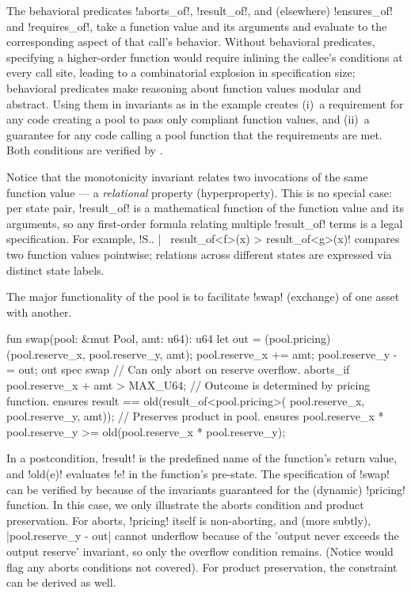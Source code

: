The behavioral predicates !aborts_of!, !result_of!, and (elsewhere) !ensures_of! and !requires_of!, take a function value and its arguments and evaluate to the corresponding aspect of that call's behavior.
Without behavioral predicates, specifying a higher-order function would require inlining the callee's conditions at every call site, leading to a combinatorial explosion in specification size; behavioral predicates make reasoning about function values modular and abstract.
Using them in invariants as in the example creates (i)~a requirement for any code creating a pool to pass only compliant function values, and (ii)~a guarantee for any code calling a pool function that the requirements are met. Both conditions are verified by \MVP.

Notice that the monotonicity invariant relates two invocations of the same function value --- a \emph{relational} property (hyperproperty).
This is no special case: per state pair, !result_of! is a mathematical function of the function value and its arguments, so any first-order formula relating multiple !result_of! terms is a legal specification.
For example, !S.. |~ result_of<f>(x) > result_of<g>(x)! compares two function values pointwise; relations across different states are expressed via distinct state labels.

The major functionality of the pool is to facilitate !swap! (exchange) of one asset with another.

\begin{MoveBox}
  fun swap(pool: &mut Pool, amt: u64): u64 {
    let out = (pool.pricing)
              (pool.reserve_x, pool.reserve_y, amt);
    pool.reserve_x += amt; pool.reserve_y -= out;
    out
  }
  spec swap {
    // Can only abort on reserve overflow.
    aborts_if pool.reserve_x + amt > MAX_U64;
    // Outcome is determined by pricing function.
    ensures result == old(result_of<pool.pricing>(
              pool.reserve_x, pool.reserve_y, amt));
    // Preserves product in pool.
    ensures pool.reserve_x * pool.reserve_y
         >= old(pool.reserve_x * pool.reserve_y);
  }
\end{MoveBox}

\noindent In a postcondition, !result! is the predefined name of the function's return value, and !old(e)! evaluates !e! in the function's pre-state.
The specification of !swap! can be verified by \MVP because of the invariants guaranteed for the (dynamic) !pricing! function. In this case, we only illustrate the aborts condition and product preservation. For aborts, !pricing! itself is non-aborting, and (more subtly), |pool.reserve_y - out| cannot underflow because of the 'output never exceeds the output reserve' invariant, so only the overflow condition remains. (Notice \MVP would flag any aborts conditions not covered). For product preservation, the constraint can be derived as well.

